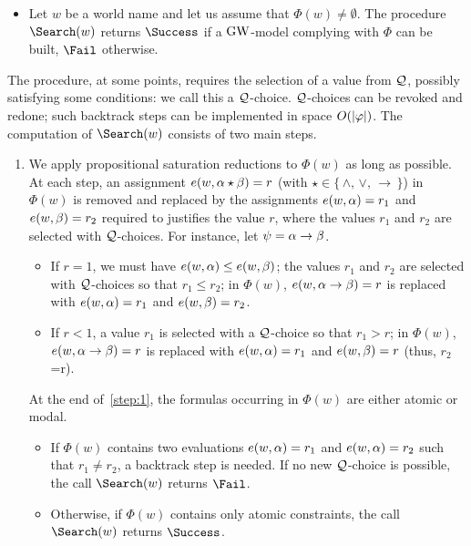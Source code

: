 \begin{itemize}
\item Let $w$ be a world name and let us assume that $\Phi(w)\neq
  \emptyset$.  The procedure $\Search(w)$ returns $\Success$ if a
  $\mbox{$\mathrm{GW}$}$-model complying with $\Phi$ can be built, $\Fail$ otherwise.
\end{itemize}

\noindent
The procedure, at some points, requires the selection of a value from
$\mathcal{Q}$, possibly satisfying some conditions: we call this a
$\mathcal{Q}$-choice.  $\mathcal{Q}$-choices can be revoked and redone; such
backtrack steps can be implemented in space $O(|\varphi|)$.  The
computation of $\Search(w)$ consists of two main steps.

\begin{enumerate}[label*=(Step~\arabic*)]
\item\label{step:1} We apply propositional saturation reductions to
  $\Phi(w)$ as long as possible. At each step, an assignment
  $e(w,\alpha\star\beta)=r$ (with $\star\in \{\,\land,\,\lor,\,\to\,\}$) in
  $\Phi(w)$ is removed and replaced by the assignments $e(w,\alpha)=r_1$
  and $e(w,\beta)=r_2$ required to justifies the value $r$, where the
  values $r_1$ and $r_2$ are selected with $\mathcal{Q}$-choices.  For
  instance, let $\psi=\alpha\to\beta$.
  \begin{itemize}
  \item If $r=1$, we must have $e(w,\alpha) \leq e(w,\beta)$; the values
    $r_1$ and $r_2$ are selected with $\mathcal{Q}$-choices so that $r_1\leq
    r_2$; in $\Phi(w)$, $e(w,\alpha\to \beta)=r$ is replaced with $e(w,\alpha )=
    r_1$ and $e(w,\beta)=r_2$.
  \item If $r<1$, a value $r_1$ is selected with a $\mathcal{Q}$-choice so
    that $r_1> r$; in $\Phi(w)$, $e(w,\alpha\to \beta)=r$ is replaced with
    $e(w,\alpha)= r_1$ and $e(w,\beta) = r$ (thus, $r_2$=r).
  \end{itemize}
  At the end of~\ref{step:1}, the formulas occurring in $\Phi(w)$ are
  either atomic or modal.
  
  \begin{itemize}
  \item If $\Phi(w)$ contains two evaluations $e(w,\alpha)=r_1$ and
    $e(w,\alpha)=r_2$ such that $r_1\neq r_2$, a backtrack step is needed.
    If no new $\mathcal{Q}$-choice is possible, the call $\Search(w)$
    returns $\Fail$.

  \item Otherwise, if $\Phi(w)$ contains only atomic constraints, the
    call $\Search(w)$ returns $\Success$.
    

\end{itemize}
\end{enumerate}
